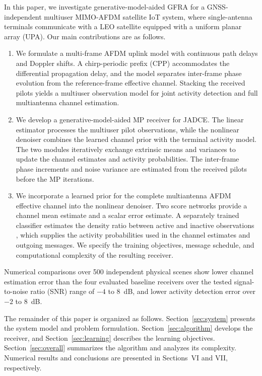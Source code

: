 In this paper, we investigate generative-model-aided GFRA for a
GNSS-independent multiuser MIMO-AFDM satellite IoT system, where
single-antenna terminals communicate with a LEO satellite equipped with
a uniform planar array (UPA). Our main contributions are as follows.
\begin{enumerate}[label=\arabic*)]
\item We formulate a multi-frame AFDM uplink model with continuous path
delays and Doppler shifts. A chirp-periodic prefix (CPP) accommodates
the differential propagation delay, and the model separates
inter-frame phase evolution from the reference-frame effective
channel. Stacking the received pilots yields a multiuser observation
model for joint activity detection and full multiantenna channel
estimation.

\item We develop a generative-model-aided MP receiver for JADCE.
The linear estimator processes the multiuser pilot observations, while
the nonlinear denoiser combines the learned channel prior with the
terminal activity model. The two modules iteratively exchange
extrinsic means and variances to update the channel estimates and
activity probabilities. The inter-frame phase increments and noise
variance are estimated from the received pilots before the MP iterations.

\item We incorporate a learned prior for the complete multiantenna
AFDM effective channel into the nonlinear denoiser. Two score networks
provide a channel mean estimate and a scalar error estimate. A
separately trained classifier estimates the density ratio between
active and inactive observations \cite{menon2016}, which supplies the
activity probabilities used in the channel estimates and outgoing
messages. We specify the training objectives, message schedule, and
computational complexity of the resulting receiver.
\end{enumerate}

Numerical comparisons over 500 independent physical scenes show lower
channel estimation error than the four evaluated baseline receivers
over the tested signal-to-noise ratio (SNR) range of $-4$ to $8$~dB,
and lower activity detection error over $-2$ to $8$~dB.

The remainder of this paper is organized as follows.
Section~\ref{sec:system} presents the system model and problem
formulation. Section~\ref{sec:algorithm} develops the receiver, and
Section~\ref{sec:learning} describes the learning objectives.
Section~\ref{sec:overall} summarizes the algorithm and analyzes its
complexity. Numerical results and conclusions are presented in
Sections~VI and VII, respectively.
